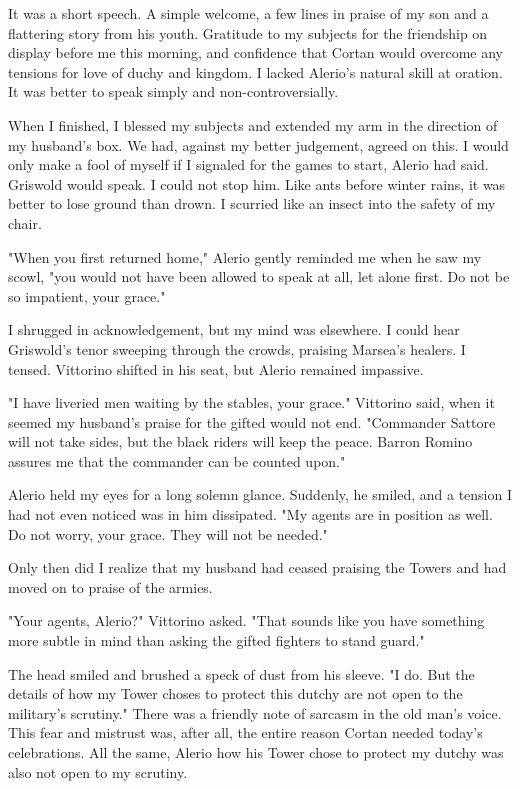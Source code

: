 \documentclass{article}
\begin{document}
It was a short speech. A simple welcome, a few lines in praise of my son and a flattering story from his youth. Gratitude to my subjects for the friendship on display before me this morning, and confidence that Cortan would overcome any tensions for love of duchy and kingdom. I lacked Alerio's natural skill at oration. It was better to speak simply and non-controversially.

When I finished, I blessed my subjects and extended my arm in the direction of my husband's box. We had, against my better judgement, agreed on this. I would only make a fool of myself if I signaled for the games to start, Alerio had said. Griswold would speak. I could not stop him. Like ants before winter rains, it was better to lose ground than drown. I scurried like an insect into the safety of my chair.

"When you first returned home," Alerio gently reminded me when he saw my scowl, "you would not have been allowed to speak at all, let alone first. Do not be so impatient, your grace."

I shrugged in acknowledgement, but my mind was elsewhere. I could hear Griswold's tenor sweeping through the crowds, praising Marsea's healers. I tensed. Vittorino shifted in his seat, but Alerio remained impassive.

"I have liveried men waiting by the stables, your grace." Vittorino said, when it seemed my husband's praise for the gifted would not end. "Commander Sattore will not take sides, but the black riders will keep the peace. Barron Romino assures me that the commander can be counted upon."

Alerio held my eyes for a long solemn glance. Suddenly, he smiled, and a tension I had not even noticed was in him dissipated. "My agents are in position as well. Do not worry, your grace. They will not be needed."

Only then did I realize that my husband had ceased praising the Towers and had moved on to praise of the armies.

"Your agents, Alerio?" Vittorino asked. "That sounds like you have something more subtle in mind than asking the gifted fighters to stand guard."

The head smiled and brushed a speck of dust from his sleeve. "I do. But the details of how my Tower choses to protect this dutchy are not open to the military's scrutiny." There was a friendly note of sarcasm in the old man's voice. This fear and mistrust was, after all, the entire reason Cortan needed today's celebrations. All the same, Alerio how his Tower chose to protect my dutchy was also not open to my scrutiny.
\end{document}
